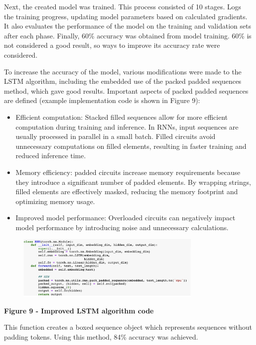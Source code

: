 Next, the created model was trained. This process consisted of 10
stages. Logs the training progress, updating model parameters based on
calculated gradients. It also evaluates the performance of the model on
the training and validation sets after each phase. Finally, 60\%
accuracy was obtained from model training. 60\% is not considered a good
result, so ways to improve its accuracy rate were considered.

To increase the accuracy of the model, various modifications were made
to the LSTM algorithm, including the embedded use of the packed padded
sequences method, which gave good results. Important aspects of packed
padded sequences are defined (example implementation code is shown in
Figure 9):

\begin{itemize}
\item
  Efficient computation: Stacked filled sequences allow for more
  efficient computation during training and inference. In RNNs, input
  sequences are usually processed in parallel in a small batch. Filled
  circuits avoid unnecessary computations on filled elements, resulting
  in faster training and reduced inference time.
\item
  Memory efficiency: padded circuits increase memory requirements
  because they introduce a significant number of padded elements. By
  wrapping strings, filled elements are effectively masked, reducing the
  memory footprint and optimizing memory usage.
\item
  Improved model performance: Overloaded circuits can negatively impact
  model performance by introducing noise and unnecessary calculations.
\end{itemize}

\begin{figure}[H]
	\centering
	\includegraphics[width=0.8\textwidth]{media/ict/image16}
	\caption*{}
\end{figure}


{\bfseries Figure 9 - Improved LSTM algorithm code}

This function creates a boxed sequence object which represents sequences
without padding tokens. Using this method, 84\% accuracy was achieved.

